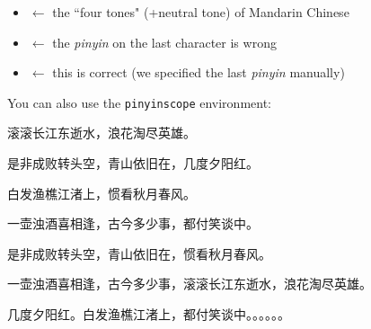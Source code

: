 \documentclass{article}
\begin{document}
	\begin{itemize}
		\item {} $\leftarrow$ the ``four tones" (+neutral tone) of Mandarin Chinese
		\item {} $\leftarrow$ the \emph{pinyin} on the last character is wrong
		\item {} $\leftarrow$ this is correct (we specified the last \emph{pinyin} manually)
	\end{itemize}

	\bigskip

	\begin{pinyinscope}
You can also use the \texttt{pinyinscope} environment:\par
\bigskip
滚滚长江东逝水，浪花淘尽英雄。\par
是非成败转头空，青山依旧在，几度夕阳红。\par
白发渔樵江渚上，惯看秋月春风。\par
一壶浊酒喜相逢，古今多少事，都付笑谈中。\par
\bigskip
是非成败转头空，青山依旧在，惯看秋月春风。\par
一壶浊酒喜相逢，古今多少事，滚滚长江东逝水，浪花淘尽英雄。\par
几度夕阳红。白发渔樵江渚上，都付笑谈中。。。。。。\par
	\end{pinyinscope}	
\end{document}
